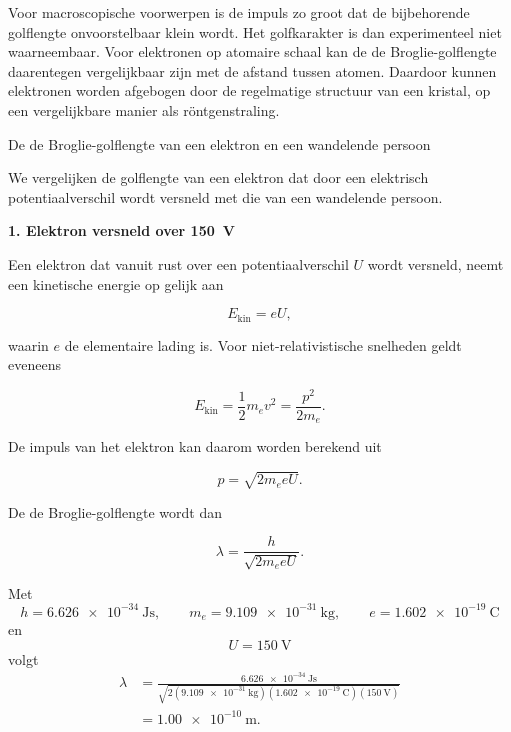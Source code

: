 Voor macroscopische voorwerpen is de impuls zo groot dat de bijbehorende golflengte onvoorstelbaar klein wordt. Het golfkarakter is dan experimenteel niet waarneembaar. Voor elektronen op atomaire schaal kan de de Broglie-golflengte daarentegen vergelijkbaar zijn met de afstand tussen atomen. Daardoor kunnen elektronen worden afgebogen door de regelmatige structuur van een kristal, op een vergelijkbare manier als röntgenstraling.

\begin{voorbeeld}{De de Broglie-golflengte van een elektron en een wandelende persoon}

We vergelijken de golflengte van een elektron dat door een elektrisch potentiaalverschil wordt versneld met die van een wandelende persoon.

\bigskip

\textbf{1. Elektron versneld over \SI{150}{\volt}}

Een elektron dat vanuit rust over een potentiaalverschil $U$ wordt versneld, neemt een kinetische energie op gelijk aan

\begin{equation*}
E_{\mathrm{kin}}=eU,
\end{equation*}

waarin $e$ de elementaire lading is. Voor niet-relativistische snelheden geldt eveneens

\begin{equation*}
E_{\mathrm{kin}}= \frac{1}{2}m_ev^2 =\frac{p^2}{2m_e}.
\end{equation*}

De impuls van het elektron kan daarom worden berekend uit

\begin{equation*}
p=\sqrt{2m_e eU}.
\end{equation*}

De de Broglie-golflengte wordt dan

\begin{equation*}
\lambda = \frac{h}{\sqrt{2m_e eU}}.
\end{equation*}

Met
\[
h=\SI{6.626e-34}{\joule\second}, \qquad m_e=\SI{9.109e-31}{\kilogram}, \qquad e=\SI{1.602e-19}{\coulomb}
\]
en
\[
U=\SI{150}{\volt}
\]
volgt
\begin{align*}
\lambda
&=
\frac{\SI{6.626e-34}{\joule\second}}
{\sqrt{
2
(\SI{9.109e-31}{\kilogram})
(\SI{1.602e-19}{\coulomb})
(\SI{150}{\volt})
}}
\\[2mm]
&=
\SI{1.00e-10}{\meter}.
\end{align*}


\end{voorbeeld}
